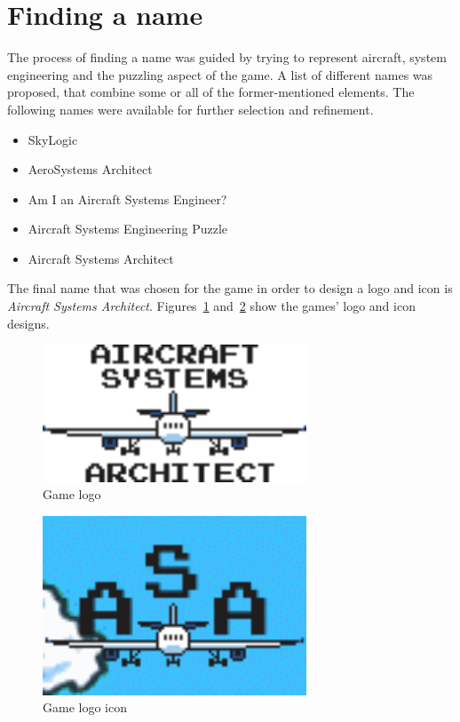 \section{Finding a name}\label{sec:finding-a-name}
The process of finding a name was guided by trying to represent aircraft, system engineering and the puzzling aspect of the game.
A list of different names was proposed, that combine some or all of the former-mentioned elements.
The following names were available for further selection and refinement.
\begin{itemize}
    \item SkyLogic
    \item AeroSystems Architect
    \item Am I an Aircraft Systems Engineer?
    \item Aircraft Systems Engineering Puzzle
    \item Aircraft Systems Architect
\end{itemize}
The final name that was chosen for the game in order to design a logo and icon is \textit{Aircraft Systems Architect}.
Figures~\ref{fig:logo} and~\ref{fig:logo-icon} show the games' logo and icon designs.
\begin{figure}
    \centering
    \includegraphics[width=0.7\textwidth]{Pictures/res/concept/aircraft-systems-architect-logo}
    \caption{Game logo}
    \label{fig:logo}
\end{figure}
\begin{figure}
    \centering
    \includegraphics[width=0.7\textwidth]{Pictures/res/concept/asa-logo}
    \caption{Game logo icon}
    \label{fig:logo-icon}
\end{figure}

